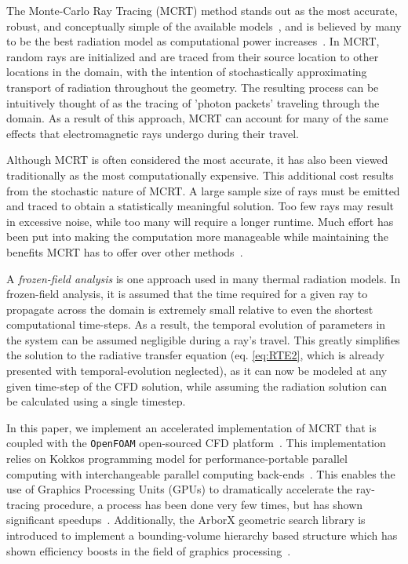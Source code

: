 The Monte-Carlo Ray Tracing (MCRT) method stands out as the most accurate, robust, and conceptually simple of the available models~\cite{Tesse2002RadiativeApproach,Modest2013RadiativeTransfer,Coelho2018RadiativeSystems}, and is believed by many to be the best radiation model as computational power increases~\cite{Howell2010ThermalTransfer}.
In MCRT, random rays are initialized and are traced from their source location to other locations in the domain, with the intention of stochastically approximating transport of radiation throughout the geometry.
The resulting process can be intuitively thought of as the tracing of 'photon packets' traveling through the domain.
As a result of this approach, MCRT can account for many of the same effects that electromagnetic rays undergo during their travel.

Although MCRT is often considered the most accurate, it has also been viewed traditionally as the most computationally expensive.
This additional cost results from the stochastic nature of MCRT. A large sample size of rays must be emitted and traced to obtain a statistically meaningful solution. 
Too few rays may result in excessive noise, while too many will require a longer runtime.
Much effort has been put into making the computation more manageable while maintaining the benefits MCRT has to offer over other methods~\cite{Liu2020TheFlames,Tesse2002RadiativeApproach,Zeeb2001AnGeometries,Modest2003BackwardTransfer,Howell2010ThermalTransfer}.

A \textit{frozen-field analysis} is one approach used in many thermal radiation models. In frozen-field analysis, it is assumed that the time required for a given ray to propagate across the domain is extremely small relative to even the shortest computational time-steps. 
As a result, the temporal evolution of parameters in the system can be assumed negligible during a ray's travel.
This greatly simplifies the solution to the radiative transfer equation (eq. \ref{eq:RTE2}, which is already presented with temporal-evolution neglected), as it can now be modeled at any given time-step of the CFD solution, while assuming the radiation solution can be calculated using a single timestep.

In this paper, we implement an accelerated implementation of MCRT that is coupled with the \verb|OpenFOAM| open-sourced CFD platform~\cite{Weller1998ATechniques}. 
This implementation relies on Kokkos programming model for performance-portable parallel computing with interchangeable parallel computing back-ends~\cite{Trott2021KokkosEra}. This enables the use of Graphics Processing Units (GPUs) to dramatically accelerate the ray-tracing procedure, a process has been done very few times, but has shown significant speedups~\cite{Silvestri2019ASimulation,Humphrey2016RadiativeRefinement,Heymann2012GPU-basedAGN}. 
Additionally, the ArborX geometric search library is introduced to implement a bounding-volume hierarchy based structure which has shown efficiency boosts in the field of graphics processing~\cite{Lebrun-Grandie2019ArborX:Library}. 

